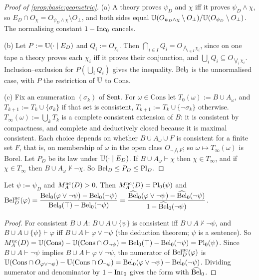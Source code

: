 \begin{proof}[Proof of \cref{prop:basic:geometric}]
(a) A theory proves $\psi_D$ and $\chi$ iff it proves $\psi_D\wedge\chi$, so $E_D\cap O_\chi=O_{\psi_D\wedge\chi}\setminus O_\bot$, and both sides equal $\mathbb{U}(O_{\psi_D\wedge\chi}\setminus O_\bot)/\mathbb{U}(O_{\psi_D}\setminus O_\bot)$. The normalising constant $1-\mathrm{Inc}_0$ cancels.

(b) Let $P:=\mathbb{U}(\cdot\mid E_D)$ and $Q_i:=O_{\chi_i}$. Then $\bigcap_{i\in I}Q_i=O_{\bigwedge_{i\in I}\chi_i}$, since on one tape a theory proves each $\chi_i$ iff it proves their conjunction, and $\bigcup_iQ_i\subseteq O_{\bigvee_i\chi_i}$. Inclusion--exclusion for $P(\bigcup_iQ_i)$ gives the inequality. $\mathrm{Bel}_0$ is the unnormalised case, with $P$ the restriction of $\mathbb{U}$ to $\mathrm{Cons}$.

(c) Fix an enumeration $(\sigma_k)$ of $\mathrm{Sent}$. For $\omega\in\mathrm{Cons}$ let $T_0(\omega):=B\cup A_\omega$, and $T_{k+1}:=T_k\cup\{\sigma_k\}$ if that set is consistent, $T_{k+1}:=T_k\cup\{\neg\sigma_k\}$ otherwise. $T_\infty(\omega):=\bigcup_kT_k$ is a complete consistent extension of $B$: it is consistent by compactness, and complete and deductively closed because it is maximal consistent. Each choice depends on whether $B\cup A_\omega\cup F$ is consistent for a finite set $F$, that is, on membership of $\omega$ in the open class $O_{\neg\bigwedge F}$; so $\omega\mapsto T_\infty(\omega)$ is Borel. Let $P_D$ be its law under $\mathbb{U}(\cdot\mid E_D)$. If $B\cup A_\omega\vdash\chi$ then $\chi\in T_\infty$, and if $\chi\in T_\infty$ then $B\cup A_\omega\nvdash\neg\chi$. So $\mathrm{Bel}_D\le P_D\le\mathrm{Pl}_D$.
\end{proof}

\begin{proposition}\label{prop:basic:dempster}
Let $\psi:=\psi_D$ and $M_{A}^{\mathrm{nc}}(D)>0$. Then $M_{A}^{\mathrm{nc}}(D)=\mathrm{Pl}_0(\psi)$ and
$\mathrm{Bel}^{\mathrm{nc}}_D(\varphi)=\dfrac{\mathrm{Bel}_0(\varphi\vee\neg\psi)-\mathrm{Bel}_0(\neg\psi)}{\mathrm{Bel}_0(\top)-\mathrm{Bel}_0(\neg\psi)}=\dfrac{\widehat{\mathrm{Bel}}_0(\varphi\vee\neg\psi)-\widehat{\mathrm{Bel}}_0(\neg\psi)}{1-\widehat{\mathrm{Bel}}_0(\neg\psi)}$.
\end{proposition}

\begin{proof}
For consistent $B\cup A$: $B\cup A\cup\{\psi\}$ is consistent iff $B\cup A\nvdash\neg\psi$, and $B\cup A\cup\{\psi\}\vdash\varphi$ iff $B\cup A\vdash\varphi\vee\neg\psi$ (the deduction theorem; $\psi$ is a sentence). So $M_{A}^{\mathrm{nc}}(D)=\mathbb{U}(\mathrm{Cons})-\mathbb{U}(\mathrm{Cons}\cap O_{\neg\psi})=\mathrm{Bel}_0(\top)-\mathrm{Bel}_0(\neg\psi)=\mathrm{Pl}_0(\psi)$. Since $B\cup A\vdash\neg\psi$ implies $B\cup A\vdash\varphi\vee\neg\psi$, the numerator of $\mathrm{Bel}^{\mathrm{nc}}_D(\varphi)$ is $\mathbb{U}(\mathrm{Cons}\cap O_{\varphi\vee\neg\psi})-\mathbb{U}(\mathrm{Cons}\cap O_{\neg\psi})=\mathrm{Bel}_0(\varphi\vee\neg\psi)-\mathrm{Bel}_0(\neg\psi)$. Dividing numerator and denominator by $1-\mathrm{Inc}_0$ gives the form with $\widehat{\mathrm{Bel}}_0$.
\end{proof}

